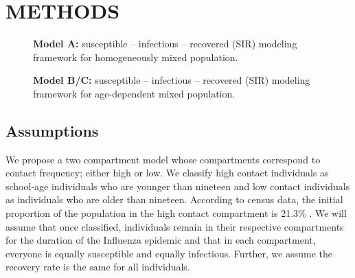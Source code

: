 \documentclass[a4paper, 12pt, journal]{ieeeconf}\usepackage[]{graphicx}\usepackage[]{color}
\begin{document}
\section{METHODS}

\begin{figure}[thpb]
	\centering
   	\resizebox{0.46\textwidth}{!}{}
    \caption{\textbf{Model A:} susceptible – infectious – recovered (SIR) modeling framework for homogeneously mixed population.}\label{F:homo}
\end{figure}

\begin{figure}[thpb]
    \resizebox{0.46\textwidth}{!}{}
    \caption{\textbf{Model B/C:} susceptible – infectious – recovered (SIR) modeling framework for age-dependent mixed population.}\label{F:het}
\end{figure}

\subsection{Assumptions}
We propose a two compartment model whose compartments correspond to contact frequency; either high or low. We classify high contact individuals as school-age individuals who are younger than nineteen and low contact individuals as individuals who are older than nineteen. According to census data, the initial proportion of the population in the high contact compartment is 21.3\% \cite{statsCanada}. We will assume that once classified, individuals remain in their respective compartments for the duration of the Influenza epidemic and that in each compartment, everyone is equally susceptible and equally infectious. Further, we assume the recovery rate is the same for all individuals.
\end{document}
